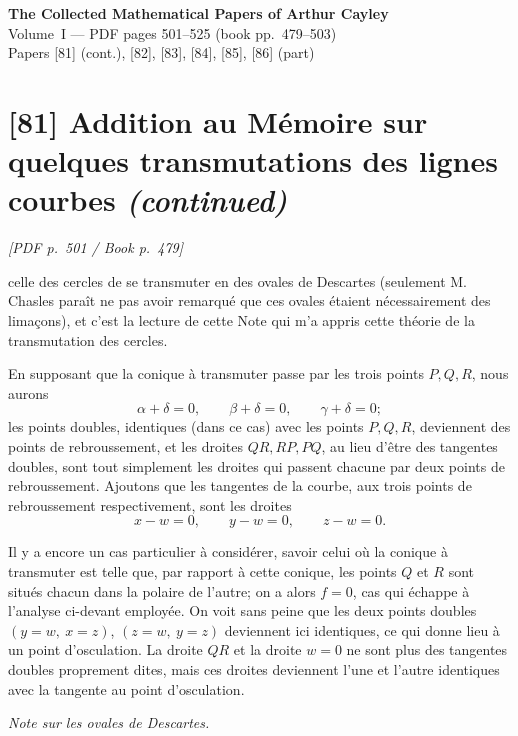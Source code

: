 \documentclass[11pt]{article}
\newcommand{\Page}[2]{\bigskip\noindent\textit{[PDF p.~#1 / Book p.~#2]}\par\smallskip}
\begin{document}
\begin{center}
{\Large\bfseries The Collected Mathematical Papers of Arthur Cayley}\\[0.4em]
{\large Volume~I --- PDF pages 501--525 (book pp.~479--503)}\\[0.4em]
{\normalsize Papers [81] (cont.), [82], [83], [84], [85], [86] (part)}
\end{center}

\vspace{0.7em}

\section*{[81] Addition au M\'emoire sur quelques transmutations des lignes courbes \emph{(continued)}}

\Page{501}{479}

celle des cercles de se transmuter en des ovales de Descartes (seulement M. Chasles
para\^it ne pas avoir remarqu\'e que ces ovales \'etaient n\'ecessairement des lima\c{c}ons),
et c'est la lecture de cette Note qui m'a appris cette th\'eorie de la transmutation
des cercles.

En supposant que la conique \`a transmuter passe par les trois points $P,Q,R$,
nous aurons
\[
        \alpha+\delta=0,\qquad \beta+\delta=0,\qquad \gamma+\delta=0;
\]
les points doubles, identiques (dans ce cas) avec les points $P,Q,R$, deviennent des
points de rebroussement, et les droites $QR,RP,PQ$, au lieu d'\^etre des tangentes
doubles, sont tout simplement les droites qui passent chacune par deux points de
rebroussement. Ajoutons que les tangentes de la courbe, aux trois points de
rebroussement respectivement, sont les droites
\[
        x-w=0,\qquad y-w=0,\qquad z-w=0.
\]

Il y a encore un cas particulier \`a consid\'erer, savoir celui o\`u la conique \`a
transmuter est telle que, par rapport \`a cette conique, les points $Q$ et $R$ sont
situ\'es chacun dans la polaire de l'autre; on a alors $f=0$, cas qui \'echappe \`a
l'analyse ci-devant employ\'ee. On voit sans peine que les deux points doubles
$(y=w,\ x=z)$, $(z=w,\ y=z)$ deviennent ici identiques, ce qui donne lieu \`a un point
d'osculation. La droite $QR$ et la droite $w=0$ ne sont plus des tangentes doubles
proprement dites, mais ces droites deviennent l'une et l'autre identiques avec la
tangente au point d'osculation.

\begin{center}
\textit{Note sur les ovales de Descartes.}
\end{center}
\end{document}
